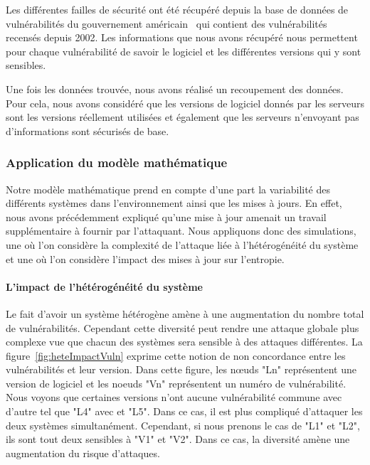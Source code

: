 Les différentes failles de sécurité ont été récupéré depuis la base de données de vulnérabilités du gouvernement américain~\cite{vulnDatabase} qui contient des vulnérabilités recensés depuis 2002.
Les informations que nous avons récupéré nous permettent pour chaque vulnérabilité de savoir le logiciel et les différentes versions qui y sont sensibles.


Une fois les données trouvée, nous avons réalisé un recoupement des données.
Pour cela, nous avons considéré que les versions de logiciel donnés par les serveurs sont les versions réellement utilisées et également que les serveurs n'envoyant pas d'informations sont sécurisés de base.


\subsubsection{Application du modèle mathématique}
Notre modèle mathématique prend en compte d'une part la variabilité des différents systèmes dans l'environnement ainsi que les mises à jours.
En effet, nous avons précédemment expliqué qu'une mise à jour amenait un travail supplémentaire à fournir par l'attaquant.
Nous appliquons donc des simulations, une où l'on considère la complexité de l'attaque liée à l'hétérogénéité du système et une où l'on considère l'impact des mises à jour sur l'entropie.

\paragraph{L'impact de l'hétérogénéité du système}
Le fait d'avoir un système hétérogène amène à une augmentation du nombre total de vulnérabilités.
Cependant cette diversité peut rendre une attaque globale plus complexe vue que chacun des systèmes sera sensible à des attaques différentes.
La figure~\ref{fig:heteImpactVuln} exprime cette notion de non concordance entre les vulnérabilités et leur version.
Dans cette figure, les nœuds "Ln" représentent une version de logiciel et les noeuds "Vn" représentent un numéro de vulnérabilité.
Nous voyons que certaines versions n'ont aucune vulnérabilité commune avec d'autre tel que "L4" avec et "L5".
Dans ce cas, il est plus compliqué d'attaquer les deux systèmes simultanément.
Cependant, si nous prenons le cas de "L1" et "L2", ils sont tout deux sensibles à "V1" et "V2".
Dans ce cas, la diversité amène une augmentation du risque d'attaques.


